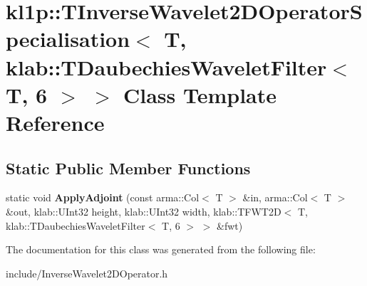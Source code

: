 \hypertarget{classkl1p_1_1TInverseWavelet2DOperatorSpecialisation_3_01T_00_01klab_1_1TDaubechiesWaveletFilter_3_01T_00_016_01_4_01_4}{}\section{kl1p\+:\+:T\+Inverse\+Wavelet2\+D\+Operator\+Specialisation$<$ T, klab\+:\+:T\+Daubechies\+Wavelet\+Filter$<$ T, 6 $>$ $>$ Class Template Reference}
\label{classkl1p_1_1TInverseWavelet2DOperatorSpecialisation_3_01T_00_01klab_1_1TDaubechiesWaveletFilter_3_01T_00_016_01_4_01_4}
\subsection*{Static Public Member Functions}
\begin{DoxyCompactItemize}
\item 
static void {\bfseries Apply\+Adjoint} (const arma\+::\+Col$<$ T $>$ \&in, arma\+::\+Col$<$ T $>$ \&out, klab\+::\+U\+Int32 height, klab\+::\+U\+Int32 width, klab\+::\+T\+F\+W\+T2D$<$ T, klab\+::\+T\+Daubechies\+Wavelet\+Filter$<$ T, 6 $>$ $>$ \&fwt)\hypertarget{classkl1p_1_1TInverseWavelet2DOperatorSpecialisation_3_01T_00_01klab_1_1TDaubechiesWaveletFilter_3_01T_00_016_01_4_01_4_abc90d4b794e1b4deda205ca92eae9245}{}\label{classkl1p_1_1TInverseWavelet2DOperatorSpecialisation_3_01T_00_01klab_1_1TDaubechiesWaveletFilter_3_01T_00_016_01_4_01_4_abc90d4b794e1b4deda205ca92eae9245}

\end{DoxyCompactItemize}


The documentation for this class was generated from the following file\+:\begin{DoxyCompactItemize}
\item 
include/Inverse\+Wavelet2\+D\+Operator.\+h\end{DoxyCompactItemize}
